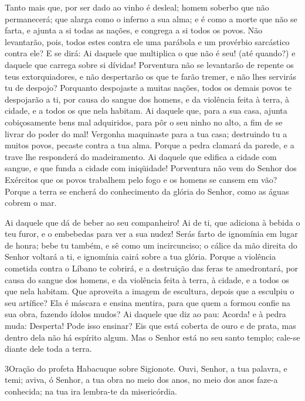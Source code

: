 Tanto mais que, por ser dado ao vinho é desleal; homem soberbo que
não permanecerá; que alarga como o inferno a sua alma; e é como a
morte que não se farta, e ajunta a si todas as nações, e congrega a
si todos os povos. Não levantarão, pois, todos estes contra ele
uma parábola e um provérbio sarcástico contra ele? E se dirá: Ai
daquele que multiplica o que não é seu! (até quando?) e daquele que
carrega sobre si dívidas! Porventura não se levantarão de
repente os teus extorquiadores, e não despertarão os que te farão
tremer, e não lhes servirás tu de despojo? Porquanto despojaste
a muitas nações, todos os demais povos te despojarão a ti, por causa
do sangue dos homens, e da violência feita à terra, à cidade, e a
todos os que nela habitam. Ai daquele que, para a sua casa,
ajunta cobiçosamente bens mal adquiridos, para pôr o seu ninho no
alto, a fim de se livrar do poder do mal! Vergonha maquinaste
para a tua casa; destruindo tu a muitos povos, pecaste contra a tua
alma. Porque a pedra clamará da parede, e a trave lhe
responderá do madeiramento. Ai daquele que edifica a cidade
com sangue, e que funda a cidade com iniqüidade! Porventura
não vem do Senhor dos Exércitos que os povos trabalhem pelo fogo e
os homens se cansem em vão? Porque a terra se encherá do
conhecimento da glória do Senhor, como as águas cobrem o mar.

Ai daquele que dá de beber ao seu companheiro! Ai de ti, que
adiciona à bebida o teu furor, e o embebedas para ver a sua nudez!
Serás farto de ignomínia em lugar de honra; bebe tu também, e
sê como um incircunciso; o cálice da mão direita do Senhor voltará a
ti, e ignomínia cairá sobre a tua glória. Porque a violência
cometida contra o Líbano te cobrirá, e a destruição das feras te
amedrontará, por causa do sangue dos homens, e da violência feita à
terra, à cidade, e a todos os que nela habitam. Que aproveita
a imagem de escultura, depois que a esculpiu o seu artífice? Ela é
máscara e ensina mentira, para que quem a formou confie na sua obra,
fazendo ídolos mudos? Ai daquele que diz ao pau: Acorda! e à
pedra muda: Desperta! Pode isso ensinar? Eis que está coberta de
ouro e de prata, mas dentro dela não há espírito algum. Mas o
Senhor está no seu santo templo; cale-se diante dele toda a terra.

\medskip

\lettrine{3} Oração do profeta Habacuque sobre Sigionote.
Ouvi, Senhor, a tua palavra, e temi; aviva, ó Senhor, a tua obra
no meio dos anos, no meio dos anos faze-a conhecida; na tua ira
lembra-te da misericórdia.

